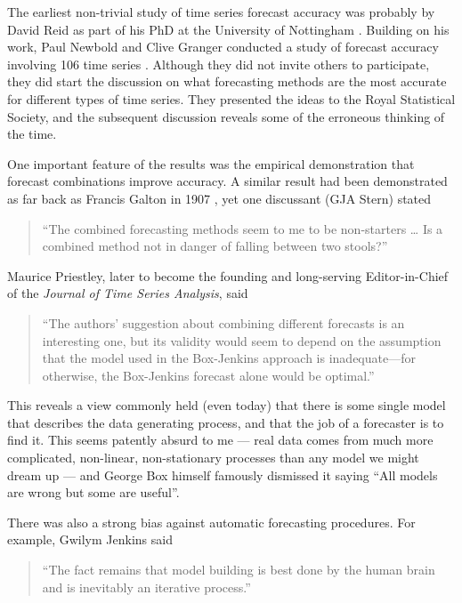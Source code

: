 \documentclass[11pt,a4paper,]{article}
\begin{document}
The earliest non-trivial study of time series forecast accuracy was probably by David Reid as part of his PhD at the University of Nottingham \autocite{reidphd}. Building on his work, Paul Newbold and Clive Granger conducted a study of forecast accuracy involving 106 time series \autocite{NewboldGranger74}. Although they did not invite others to participate, they did start the discussion on what forecasting methods are the most accurate for different types of time series. They presented the ideas to the Royal Statistical Society, and the subsequent discussion reveals some of the erroneous thinking of the time.

One important feature of the results was the empirical demonstration that forecast combinations improve accuracy. A similar result had been demonstrated as far back as Francis Galton in 1907 \autocite{Wallis2014}, yet one discussant (GJA Stern) stated

\begin{quote}
``The combined forecasting methods seem to me to be non-starters \ldots{} Is a combined method not in danger of falling between two stools?''
\end{quote}

Maurice Priestley, later to become the founding and long-serving Editor-in-Chief of the \emph{Journal of Time Series Analysis}, said

\begin{quote}
``The authors' suggestion about combining different forecasts is an interesting one, but its validity would seem to depend on the assumption that the model used in the Box-Jenkins approach is inadequate---for otherwise, the Box-Jenkins forecast alone would be optimal.''
\end{quote}

This reveals a view commonly held (even today) that there is some single model that describes the data generating process, and that the job of a forecaster is to find it. This seems patently absurd to me --- real data comes from much more complicated, non-linear, non-stationary processes than any model we might dream up --- and George Box himself famously dismissed it saying ``All models are wrong but some are useful''.

There was also a strong bias against automatic forecasting procedures. For example, Gwilym Jenkins said

\begin{quote}
``The fact remains that model building is best done by the human brain and is inevitably an iterative process.''
\end{quote}
\end{document}
